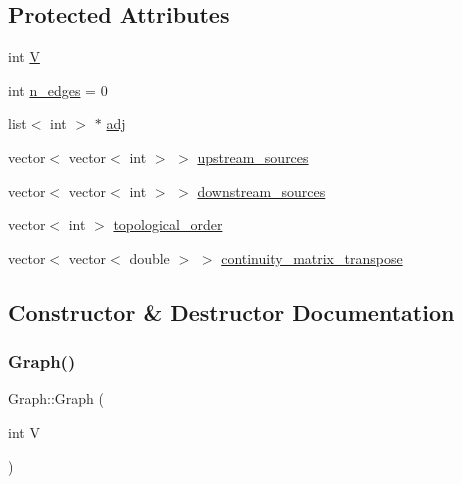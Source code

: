 \subsection*{Protected Attributes}
\begin{DoxyCompactItemize}
\item 
int \mbox{\hyperlink{classGraph_a2b722f7cfa7a21e4cb5fae488b3d4dcc_a2b722f7cfa7a21e4cb5fae488b3d4dcc}{V}}
\item 
int \mbox{\hyperlink{classGraph_a9a7e34b482b020fa136fc8e0fa2d0030_a9a7e34b482b020fa136fc8e0fa2d0030}{n\+\_\+edges}} = 0
\item 
list$<$ int $>$ $\ast$ \mbox{\hyperlink{classGraph_a04ab9c17ad31aa036def8db0f88b035b_a04ab9c17ad31aa036def8db0f88b035b}{adj}}
\item 
vector$<$ vector$<$ int $>$ $>$ \mbox{\hyperlink{classGraph_a2b9dc8c44ac87d67b061af1bf8dab2fa_a2b9dc8c44ac87d67b061af1bf8dab2fa}{upstream\+\_\+sources}}
\item 
vector$<$ vector$<$ int $>$ $>$ \mbox{\hyperlink{classGraph_a1c89a48555f165ef3e80b85ca5655bea_a1c89a48555f165ef3e80b85ca5655bea}{downstream\+\_\+sources}}
\item 
vector$<$ int $>$ \mbox{\hyperlink{classGraph_ad18af6207537a43b3cf53b56acaf92fd_ad18af6207537a43b3cf53b56acaf92fd}{topological\+\_\+order}}
\item 
vector$<$ vector$<$ double $>$ $>$ \mbox{\hyperlink{classGraph_af903899bcb412f62ec4aa295eef9f45c_af903899bcb412f62ec4aa295eef9f45c}{continuity\+\_\+matrix\+\_\+transpose}}
\end{DoxyCompactItemize}


\subsection{Constructor \& Destructor Documentation}
\mbox{\label{classGraph_af3ff6b295df8bf3bee0bafd7c7d56915_af3ff6b295df8bf3bee0bafd7c7d56915}} 
\subsubsection{\texorpdfstring{Graph()}{Graph()}\hspace{0.1cm}{\footnotesize\ttfamily [1/2]}}
{\footnotesize\ttfamily Graph\+::\+Graph (\begin{DoxyParamCaption}\item[{int}]{V }\end{DoxyParamCaption})}

